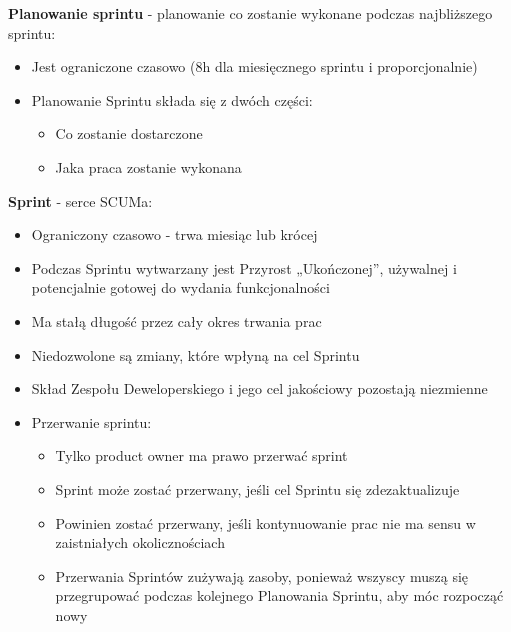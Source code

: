 \documentclass[12pt]{article}
\begin{document}
    \begin{definition}
        \textbf{Planowanie sprintu} - planowanie co zostanie wykonane podczas najbliższego sprintu:
        \begin{itemize}
            \item Jest ograniczone czasowo (8h dla miesięcznego sprintu i proporcjonalnie)
            \item Planowanie Sprintu składa się z dwóch części:
            \begin{itemize}
                \item Co zostanie dostarczone
                \item Jaka praca zostanie wykonana
            \end{itemize}
        \end{itemize}
    \end{definition}

    \begin{definition}
        \textbf{Sprint} - serce SCUMa:
        \begin{itemize}
            \item Ograniczony czasowo - trwa miesiąc lub krócej
            \item Podczas Sprintu wytwarzany jest Przyrost „Ukończonej”, używalnej i potencjalnie gotowej do wydania funkcjonalności
            \item Ma stałą długość przez cały okres trwania prac
            \item Niedozwolone są zmiany, które wpłyną na cel Sprintu
            \item Skład Zespołu Deweloperskiego i jego cel jakościowy pozostają niezmienne
            \item Przerwanie sprintu:
            \begin{itemize}
                \item Tylko product owner ma prawo przerwać sprint
                \item Sprint może zostać przerwany, jeśli cel Sprintu się zdezaktualizuje
                \item Powinien zostać przerwany, jeśli kontynuowanie prac nie ma sensu w zaistniałych okolicznościach
                \item Przerwania Sprintów zużywają zasoby, ponieważ wszyscy muszą się przegrupować podczas kolejnego Planowania Sprintu, aby móc rozpocząć nowy
            \end{itemize}
        \end{itemize}
    \end{definition}
\end{document}
